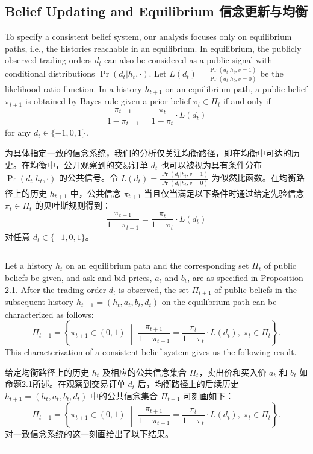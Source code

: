 \documentclass[12pt,a4paper]{article}
\newenvironment{original}{%
  \par\vspace{4pt}\noindent%
  \color{black}%
  \ignorespaces
}{%
  \par\vspace{2pt}%
}
\newenvironment{translation}{%
  \par\vspace{2pt}\noindent%
  \color{transblue}%
  \ignorespaces
}{%
  \par\vspace{4pt}\hrule\vspace{6pt}%
}
\begin{document}
\newpage

\subsection{Belief Updating and Equilibrium \hfill 信念更新与均衡}

\begin{original}
To specify a consistent belief system, our analysis focuses only on equilibrium paths, i.e., the histories reachable in an equilibrium. In equilibrium, the publicly observed trading orders $d_t$ can also be considered as a public signal with conditional distributions $\Pr(d_t|h_t, \cdot)$. Let $L(d_t) = \frac{\Pr(d_t|h_t, v=1)}{\Pr(d_t|h_t, v=0)}$ be the likelihood ratio function. In a history $h_{t+1}$ on an equilibrium path, a public belief $\pi_{t+1}$ is obtained by Bayes rule given a prior belief $\pi_t \in \Pi_t$ if and only if
\[
\frac{\pi_{t+1}}{1 - \pi_{t+1}} = \frac{\pi_t}{1 - \pi_t} \cdot L(d_t)
\]
for any $d_t \in \{-1, 0, 1\}$.
\end{original}
\begin{translation}
为具体指定一致的信念系统，我们的分析仅关注均衡路径，即在均衡中可达的历史。在均衡中，公开观察到的交易订单 $d_t$ 也可以被视为具有条件分布 $\Pr(d_t|h_t, \cdot)$ 的公共信号。令 $L(d_t) = \frac{\Pr(d_t|h_t, v=1)}{\Pr(d_t|h_t, v=0)}$ 为似然比函数。在均衡路径上的历史 $h_{t+1}$ 中，公共信念 $\pi_{t+1}$ 当且仅当满足以下条件时通过给定先验信念 $\pi_t \in \Pi_t$ 的贝叶斯规则得到：
\[
\frac{\pi_{t+1}}{1 - \pi_{t+1}} = \frac{\pi_t}{1 - \pi_t} \cdot L(d_t)
\]
对任意 $d_t \in \{-1, 0, 1\}$。
\end{translation}

\begin{original}
Let a history $h_t$ on an equilibrium path and the corresponding set $\Pi_t$ of public beliefs be given, and ask and bid prices, $a_t$ and $b_t$, are as specified in Proposition 2.1. After the trading order $d_t$ is observed, the set $\Pi_{t+1}$ of public beliefs in the subsequent history $h_{t+1} = (h_t, a_t, b_t, d_t)$ on the equilibrium path can be characterized as follows:
\[
\Pi_{t+1} = \left\{ \pi_{t+1} \in (0, 1) \;\middle|\; \frac{\pi_{t+1}}{1 - \pi_{t+1}} = \frac{\pi_t}{1 - \pi_t} \cdot L(d_t), \; \pi_t \in \Pi_t \right\}.
\]
This characterization of a consistent belief system gives us the following result.
\end{original}
\begin{translation}
给定均衡路径上的历史 $h_t$ 及相应的公共信念集合 $\Pi_t$，卖出价和买入价 $a_t$ 和 $b_t$ 如命题2.1所述。在观察到交易订单 $d_t$ 后，均衡路径上的后续历史 $h_{t+1} = (h_t, a_t, b_t, d_t)$ 中的公共信念集合 $\Pi_{t+1}$ 可刻画如下：
\[
\Pi_{t+1} = \left\{ \pi_{t+1} \in (0, 1) \;\middle|\; \frac{\pi_{t+1}}{1 - \pi_{t+1}} = \frac{\pi_t}{1 - \pi_t} \cdot L(d_t), \; \pi_t \in \Pi_t \right\}.
\]
对一致信念系统的这一刻画给出了以下结果。
\end{translation}
\end{document}
